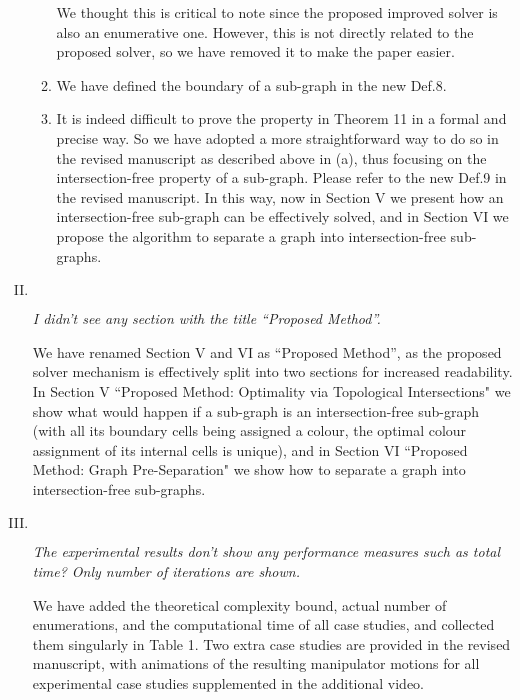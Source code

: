 \documentclass[11pt]{article}
\newenvironment{reviewer}
{\begin{mdframed}[roundcorner = 10pt,fontcolor=blue!70!black]\itshape}
{\end{mdframed}}
\begin{document}
\begin{enumerate}[I.]
\begin{enumerate}
We thought this is critical to note since the proposed improved solver is also an enumerative one. 
However, this is not directly related to the proposed solver, so we have removed it to make the paper easier. 
\item We have defined the boundary of a sub-graph in the new Def.8. 
\item It is indeed difficult to prove the property in Theorem 11 in a formal and precise way. 
So we have adopted a more straightforward way to do so in the revised manuscript as described above in (a), thus focusing on the intersection-free property of a sub-graph.
Please refer to  the new Def.9 in the revised manuscript. 
In this way, now in Section V we present how an intersection-free sub-graph can be effectively solved, and in Section VI we propose 
the algorithm to separate a graph into intersection-free sub-graphs. 
\end{enumerate}
  
\item $ $
\begin{reviewer}
I didn’t see any section with the title “Proposed Method”. 
\end{reviewer}

\noindent
We have renamed Section V and VI as ``Proposed Method'', as the proposed solver mechanism is effectively split into two sections for increased readability.
In Section V ``Proposed Method: Optimality via Topological Intersections" we show what would happen if a sub-graph is an intersection-free sub-graph (with all its boundary cells being assigned a colour, the optimal colour assignment of its internal cells is unique), and in Section VI ``Proposed Method: Graph Pre-Separation" we show how to separate a graph into intersection-free sub-graphs. 


  \item $ $
  \begin{reviewer}
The experimental results don’t show any performance measures such as total time? Only number of iterations are shown.  
   \end{reviewer}

\noindent
We have added the theoretical complexity bound, actual number of enumerations, and the computational time of all case studies, and collected  them singularly in Table 1. 
Two extra case studies are provided in the revised manuscript, with animations of the resulting manipulator motions for all experimental case studies supplemented in the additional video. 
\end{enumerate}
\end{document}
